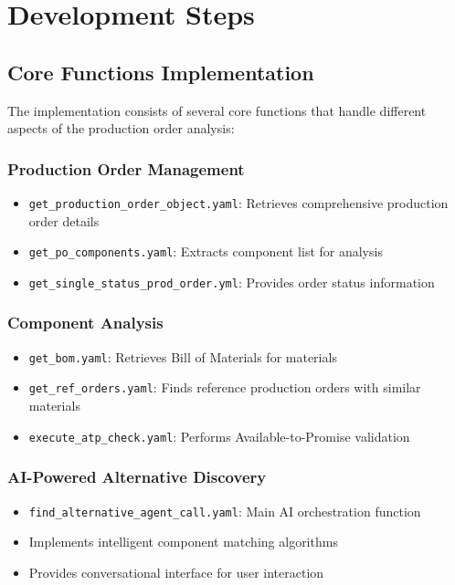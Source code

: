 \section{Development Steps}

\subsection{Core Functions Implementation}

The implementation consists of several core functions that handle different aspects of the production order analysis:

\subsubsection{Production Order Management}
\begin{itemize}
    \item \texttt{get\_production\_order\_object.yaml}: Retrieves comprehensive production order details
    \item \texttt{get\_po\_components.yaml}: Extracts component list for analysis
    \item \texttt{get\_single\_status\_prod\_order.yml}: Provides order status information
\end{itemize}

\subsubsection{Component Analysis}
\begin{itemize}
    \item \texttt{get\_bom.yaml}: Retrieves Bill of Materials for materials
    \item \texttt{get\_ref\_orders.yaml}: Finds reference production orders with similar materials
    \item \texttt{execute\_atp\_check.yaml}: Performs Available-to-Promise validation
\end{itemize}

\subsubsection{AI-Powered Alternative Discovery}
\begin{itemize}
    \item \texttt{find\_alternative\_agent\_call.yaml}: Main AI orchestration function
    \item Implements intelligent component matching algorithms
    \item Provides conversational interface for user interaction
\end{itemize}

